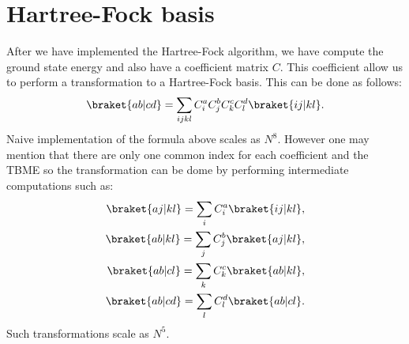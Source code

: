 \section{Hartree-Fock basis}
After we have implemented the Hartree-Fock algorithm, we have compute the ground state energy and also have a coefficient matrix $C$. This coefficient allow us to perform a transformation to a Hartree-Fock basis. This can be done as follows:
\begin{equation}
\braket{ab|cd}=\sum_{ijkl}C_i^aC_j^bC_k^cC_l^d \braket{ij|kl}.
\end{equation}
Naive implementation of the formula above scales as $N^8$.
However one may mention that there are only one common index for each coefficient and the TBME so the transformation can be dome  by performing intermediate computations such as:
\begin{align}
\braket{aj|kl}=\sum_{i}C_i^a \braket{ij|kl},\\
\braket{ab|kl}=\sum_{j}C_j^b \braket{aj|kl},\\
\braket{ab|cl}=\sum_{k}C_k^c \braket{ab|kl},\\
\braket{ab|cd}=\sum_{l}C_l^d \braket{ab|cl}.
\end{align} 
Such transformations scale as $N^5$.
